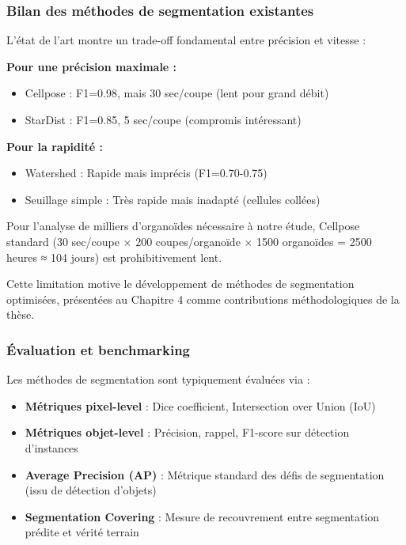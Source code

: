 \subsubsection{Bilan des méthodes de segmentation existantes}

L'état de l'art montre un trade-off fondamental entre précision et vitesse :

\textbf{Pour une précision maximale :}
\begin{itemize}
    \item Cellpose : F1=0.98, mais 30 sec/coupe (lent pour grand débit)
    \item StarDist : F1=0.85, 5 sec/coupe (compromis intéressant)
\end{itemize}

\textbf{Pour la rapidité :}
\begin{itemize}
    \item Watershed : Rapide mais imprécis (F1=0.70-0.75)
    \item Seuillage simple : Très rapide mais inadapté (cellules collées)
\end{itemize}

Pour l'analyse de milliers d'organoïdes nécessaire à notre étude, Cellpose standard (30 sec/coupe × 200 coupes/organoïde × 1500 organoïdes = 2500 heures ≈ 104 jours) est prohibitivement lent.

Cette limitation motive le développement de méthodes de segmentation optimisées, présentées au Chapitre 4 comme contributions méthodologiques de la thèse.

\subsubsection{Évaluation et benchmarking}

Les méthodes de segmentation sont typiquement évaluées via :
\begin{itemize}
    \item \textbf{Métriques pixel-level} : Dice coefficient, Intersection over Union (IoU)
    \item \textbf{Métriques objet-level} : Précision, rappel, F1-score sur détection d'instances
    \item \textbf{Average Precision (AP)} : Métrique standard des défis de segmentation (issu de détection d'objets)
    \item \textbf{Segmentation Covering} : Mesure de recouvrement entre segmentation prédite et vérité terrain
\end{itemize}

